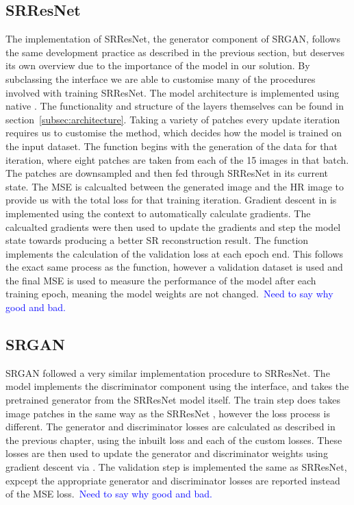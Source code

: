 \subsection{SRResNet}
The implementation of SRResNet, the generator component of SRGAN, follows the same development practice as described in the previous section, but deserves its own overview due to the importance of the model in our solution. By subclassing the  interface we are able to customise many of the procedures involved with training SRResNet. The model architecture is implemented using native . The functionality and structure of the layers themselves can be found in section~\ref{subsec:architecture}. Taking a variety of patches every update iteration requires us to customise the  method, which decides how the model is trained on the input dataset. The  function begins with the generation of the data for that iteration, where eight patches are taken from each of the 15 images in that batch. The patches are downsampled and then fed through SRResNet in its current state. The MSE is calcualted between the generated image and the HR image to provide us with the total loss for that training iteration. Gradient descent in  is implemented using the  context to automatically calculate gradients. The calcualted gradients were then used to update the gradients and step the model state towards producing a better SR reconstruction result. The  function implements the calculation of the validation loss at each epoch end. This follows the exact same process as the  function, however a validation dataset is used and the final MSE is used to measure the performance of the model after each training epoch, meaning the model weights are not changed.\ \textcolor{blue}{Need to say why good and bad.}

\subsection{SRGAN}
SRGAN followed a very similar implementation procedure to SRResNet. The model implements the discriminator component using the  interface, and takes the pretrained generator from the SRResNet model itself. The train step does takes image patches in the same way as the SRResNet , however the loss process is different. The generator and discriminator losses are calculated as described in the previous chapter, using the inbuilt  loss and each of the custom losses. These losses are then used to update the generator and discriminator weights using gradient descent via . The validation step is implemented the same as SRResNet, expcept the appropriate generator and discriminator losses are reported instead of the MSE loss.\ \textcolor{blue}{Need to say why good and bad.}

